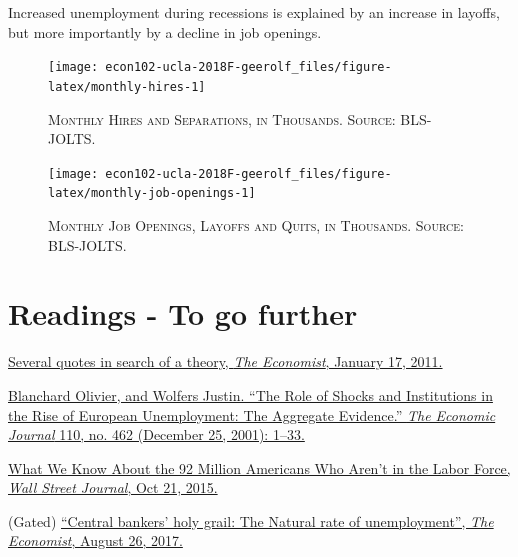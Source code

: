 \documentclass[]{book}
\theoremstyle{definition}
\theoremstyle{definition}
\theoremstyle{definition}
\theoremstyle{remark}
\begin{document}
Increased unemployment during recessions is explained by an increase in
layoffs, but more importantly by a decline in job openings.




\begin{figure}

{\centering \texttt{[image: econ102-ucla-2018F-geerolf\_files/figure-latex/monthly-hires-1]} 

}

\caption{\textsc{Monthly Hires and Separations, in Thousands.
Source: BLS-JOLTS}.}\label{fig:monthly-hires}
\end{figure}




\begin{figure}

{\centering \texttt{[image: econ102-ucla-2018F-geerolf\_files/figure-latex/monthly-job-openings-1]} 

}

\caption{\textsc{Monthly Job Openings, Layoffs and
Quits, in Thousands. Source: BLS-JOLTS}.}\label{fig:monthly-job-openings}
\end{figure}

\section*{Readings - To go further}\label{readings---to-go-further-5}

\href{https://www.economist.com/free-exchange/2011/01/17/several-quotes-in-search-of-a-theory}{Several
quotes in search of a theory, \emph{The Economist}, January 17, 2011.}

\href{https://doi.org/10.1111/1468-0297.00518}{Blanchard Olivier, and
Wolfers Justin. ``The Role of Shocks and Institutions in the Rise of
European Unemployment: The Aggregate Evidence.'' \emph{The Economic
Journal} 110, no. 462 (December 25, 2001): 1--33.}

\href{https://blogs.wsj.com/economics/2015/10/21/what-we-know-about-the-92-million-americans-who-arent-in-the-labor-force/}{What
We Know About the 92 Million Americans Who Aren't in the Labor Force,
\emph{Wall Street Journal}, Oct 21, 2015.}

(Gated)
\href{https://www.economist.com/economics-brief/2017/08/26/the-natural-rate-of-unemployment}{``Central
bankers' holy grail: The Natural rate of unemployment'', \emph{The
Economist}, August 26, 2017.}
\end{document}
